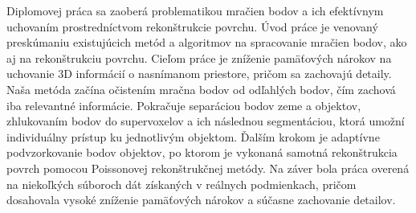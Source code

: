 Diplomovej práca sa zaoberá problematikou mračien bodov a ich efektívnym uchovaním prostredníctvom rekonštrukcie povrchu. Úvod práce je venovaný preskúmaniu existujúcich metód a algoritmov na spracovanie mračien bodov, ako aj na rekonštrukciu povrchu. Cieľom práce je zníženie pamäťových nárokov na uchovanie 3D informácií o nasnímanom priestore, pričom sa zachovajú detaily. Naša metóda začína očistením mračna bodov od odľahlých bodov, čím zachová iba relevantné informácie. Pokračuje separáciou bodov zeme a objektov, zhlukovaním bodov do supervoxelov a ich následnou segmentáciou, ktorá umožní individuálny prístup ku jednotlivým objektom. Ďalším krokom je adaptívne podvzorkovanie bodov objektov, po ktorom je vykonaná samotná rekonštrukcia povrch pomocou Poissonovej rekonštrukčnej metódy. Na záver bola práca overená na niekoľkých súboroch dát získaných v reálnych podmienkach, pričom dosahovala vysoké zníženie pamäťových nárokov a súčasne zachovanie detailov. 